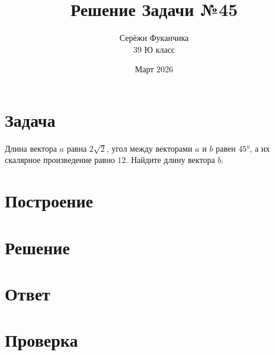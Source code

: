 \documentclass{article}
\title{Решение Задачи №45}
\author{Серёжи Фуканчика\\39 Ю класс}
\date{Март 2026}
\begin{document}
\maketitle

\section{Задача}
Длина вектора $a$ равна $2\sqrt{2}$, угол между векторами $a$ и $b$ равен $\ang{45}$, а их скалярное произведение равно $12$. Найдите длину вектора $b$.

\section{Построение}

\section{Решение}

\section{Ответ}

\section{Проверка}
\end{document}
